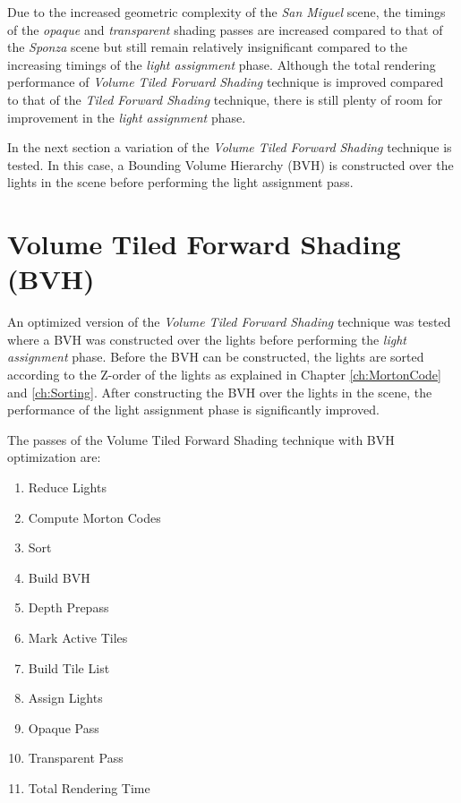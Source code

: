 Due to the increased geometric complexity of the \emph{San Miguel} scene, the timings of the \emph{opaque} and \emph{transparent} shading passes are increased compared to that of the \emph{Sponza} scene but still remain relatively insignificant compared to the increasing timings of the \emph{light assignment} phase. Although the total rendering performance of \emph{Volume Tiled Forward Shading} technique is improved compared to that of the \emph{Tiled Forward Shading} technique, there is still plenty of room for improvement in the \emph{light assignment} phase.

In the next section a variation of the \emph{Volume Tiled Forward Shading} technique is tested. In this case, a Bounding Volume Hierarchy (BVH) is constructed over the lights in the scene before performing the light assignment pass.

\section{Volume Tiled Forward Shading (BVH)}

An optimized version of the \emph{Volume Tiled Forward Shading} technique was tested where a BVH was constructed over the lights before performing the \emph{light assignment} phase. Before the BVH can be constructed, the lights are sorted according to the Z-order of the lights as explained in Chapter \ref{ch:MortonCode} and \ref{ch:Sorting}. After constructing the BVH over the lights in the scene, the performance of the light assignment phase is significantly improved.

The passes of the Volume Tiled Forward Shading technique with BVH optimization are:

\begin{enumerate}
\item{Reduce Lights}
\item{Compute Morton Codes}
\item{Sort}
\item{Build BVH}
\item{Depth Prepass}
\item{Mark Active Tiles}
\item{Build Tile List}
\item{Assign Lights}
\item{Opaque Pass}
\item{Transparent Pass}
\item{Total Rendering Time}
\end{enumerate}

